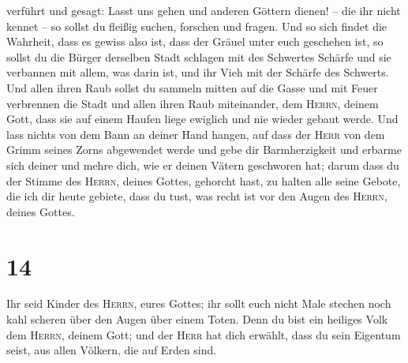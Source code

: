 verführt und gesagt: Lasst uns gehen und anderen Göttern dienen! -- die
ihr nicht kennet --  so sollst du fleißig suchen,
forschen und fragen. Und so sich findet die Wahrheit, dass es gewiss
also ist, dass der Gräuel unter euch geschehen ist,  so
sollst du die Bürger derselben Stadt schlagen mit des Schwertes Schärfe
und sie verbannen mit allem, was darin ist, und ihr Vieh mit der Schärfe
des Schwerts.  Und allen ihren Raub sollst du sammeln
mitten auf die Gasse und mit Feuer verbrennen die Stadt und allen ihren
Raub miteinander, dem \textsc{Herrn}, deinem Gott, dass sie auf einem
Haufen liege ewiglich und nie wieder gebaut werde.  Und
lass nichts von dem Bann an deiner Hand hangen, auf dass der
\textsc{Herr} von dem Grimm seines Zorns abgewendet werde und gebe dir
Barmherzigkeit und erbarme sich deiner und mehre dich, wie er deinen
Vätern geschworen hat;  darum dass du der Stimme des
\textsc{Herrn}, deines Gottes, gehorcht hast, zu halten alle seine
Gebote, die ich dir heute gebiete, dass du tust, was recht ist vor den
Augen des \textsc{Herrn}, deines Gottes.

\hypertarget{section-13}{%
\section{14}\label{section-13}}

 Ihr seid Kinder des \textsc{Herrn}, eures Gottes; ihr
sollt euch nicht Male stechen noch kahl scheren über den Augen über
einem Toten.  Denn du bist ein heiliges Volk dem
\textsc{Herrn}, deinem Gott; und der \textsc{Herr} hat dich erwählt,
dass du sein Eigentum seist, aus allen Völkern, die auf Erden sind.

